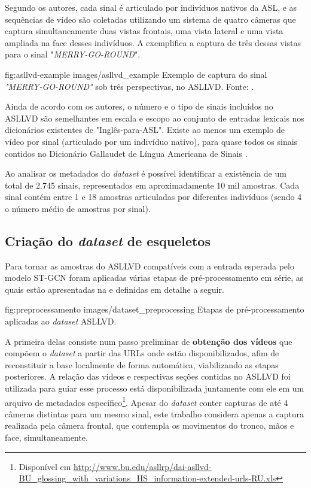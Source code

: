 Segundo os autores, cada sinal é articulado por indivíduos nativos da ASL, e as sequências de vídeo são coletadas utilizando um sistema de quatro câmeras que captura simultaneamente duas vistas frontais, uma vista lateral e uma vista ampliada na face desses indivíduos. A  exemplifica a captura de três dessas vistas para o sinal "\textit{MERRY-GO-ROUND}".

\image
    {fig:asllvd-example}
    {images/asllvd_example}
    {Exemplo de captura do sinal \textit{"MERRY-GO-ROUND"} sob três perspectivas, no ASLLVD. Fonte:  \cite[p. 2]{athitsos-asllvd-2008}.}

Ainda de acordo com os autores, o número e o tipo de sinais incluídos no ASLLVD são semelhantes em escala e escopo ao conjunto de entradas lexicais nos dicionários existentes de "Inglês-para-ASL". Existe ao menos um exemplo de vídeo por sinal (articulado por um indivíduo nativo), para quase todos os sinais contidos no Dicionário Gallaudet de Língua Americana de Sinais \cite{athitsos-asllvd-2008, gallaudet-2005}. 

Ao analisar os metadados do \textit{dataset} é possível identificar a existência de um total de 2.745 sinais, representados em aproximadamente 10 mil amostras. Cada sinal contém entre 1 e 18 amostras articuladas por diferentes indivíduos (sendo 4 o número médio de amostras por sinal).


\subsection{Criação do \textit{dataset} de esqueletos} %
\label{sec:criacao-dataset}

Para tornar as amostras do ASLLVD compatíveis com a entrada esperada pelo modelo ST-GCN foram aplicadas várias etapas de pré-processamento em série, as quais estão apresentadas na  e definidas em detalhe a seguir.

\image
    {fig:preprocessamento}
    {images/dataset_preprocessing}
    {Etapas de pré-processamento aplicadas ao \textit{dataset} ASLLVD.}

A primeira delas consiste num passo preliminar de \textbf{obtenção dos vídeos} que compõem o \textit{dataset} a partir das URLs onde estão disponibilizados, afim de reconstituir a base localmente de forma automática, viabilizando as etapas posteriores. A relação das vídeos e respectivas seções contidas no ASLLVD foi utilizada para guiar esse processo está disponibilizada juntamente com ele em um arquivo de metadados específico\footnote{
    Disponível em \url{http://www.bu.edu/asllrp/dai-asllvd-BU_glossing_with_variations_HS_information-extended-urls-RU.xls}
}. Apesar do \textit{dataset} conter capturas de até 4 câmeras distintas para um mesmo sinal, este trabalho considera apenas a captura realizada pela câmera frontal, que contempla os movimentos do tronco, mãos e face, simultaneamente.

